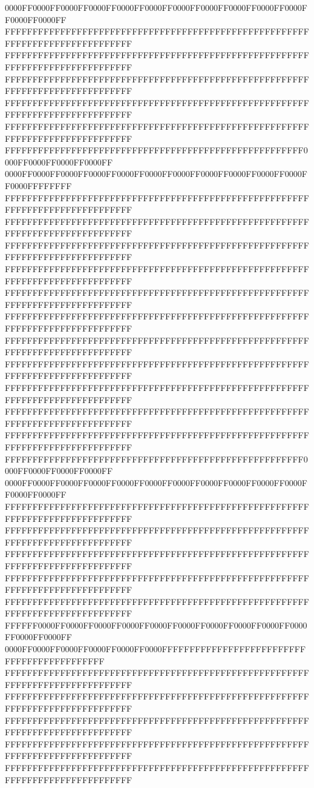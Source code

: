0000FF0000FF0000FF0000FF0000FF0000FF0000FF0000FF0000FF0000FF0000FF0000FF0000FF
FFFFFFFFFFFFFFFFFFFFFFFFFFFFFFFFFFFFFFFFFFFFFFFFFFFFFFFFFFFFFFFFFFFFFFFFFFFFFF
FFFFFFFFFFFFFFFFFFFFFFFFFFFFFFFFFFFFFFFFFFFFFFFFFFFFFFFFFFFFFFFFFFFFFFFFFFFFFF
FFFFFFFFFFFFFFFFFFFFFFFFFFFFFFFFFFFFFFFFFFFFFFFFFFFFFFFFFFFFFFFFFFFFFFFFFFFFFF
FFFFFFFFFFFFFFFFFFFFFFFFFFFFFFFFFFFFFFFFFFFFFFFFFFFFFFFFFFFFFFFFFFFFFFFFFFFFFF
FFFFFFFFFFFFFFFFFFFFFFFFFFFFFFFFFFFFFFFFFFFFFFFFFFFFFFFFFFFFFFFFFFFFFFFFFFFFFF
FFFFFFFFFFFFFFFFFFFFFFFFFFFFFFFFFFFFFFFFFFFFFFFFFFFFFF0000FF0000FF0000FF0000FF
0000FF0000FF0000FF0000FF0000FF0000FF0000FF0000FF0000FF0000FF0000FF0000FFFFFFFF
FFFFFFFFFFFFFFFFFFFFFFFFFFFFFFFFFFFFFFFFFFFFFFFFFFFFFFFFFFFFFFFFFFFFFFFFFFFFFF
FFFFFFFFFFFFFFFFFFFFFFFFFFFFFFFFFFFFFFFFFFFFFFFFFFFFFFFFFFFFFFFFFFFFFFFFFFFFFF
FFFFFFFFFFFFFFFFFFFFFFFFFFFFFFFFFFFFFFFFFFFFFFFFFFFFFFFFFFFFFFFFFFFFFFFFFFFFFF
FFFFFFFFFFFFFFFFFFFFFFFFFFFFFFFFFFFFFFFFFFFFFFFFFFFFFFFFFFFFFFFFFFFFFFFFFFFFFF
FFFFFFFFFFFFFFFFFFFFFFFFFFFFFFFFFFFFFFFFFFFFFFFFFFFFFFFFFFFFFFFFFFFFFFFFFFFFFF
FFFFFFFFFFFFFFFFFFFFFFFFFFFFFFFFFFFFFFFFFFFFFFFFFFFFFFFFFFFFFFFFFFFFFFFFFFFFFF
FFFFFFFFFFFFFFFFFFFFFFFFFFFFFFFFFFFFFFFFFFFFFFFFFFFFFFFFFFFFFFFFFFFFFFFFFFFFFF
FFFFFFFFFFFFFFFFFFFFFFFFFFFFFFFFFFFFFFFFFFFFFFFFFFFFFFFFFFFFFFFFFFFFFFFFFFFFFF
FFFFFFFFFFFFFFFFFFFFFFFFFFFFFFFFFFFFFFFFFFFFFFFFFFFFFFFFFFFFFFFFFFFFFFFFFFFFFF
FFFFFFFFFFFFFFFFFFFFFFFFFFFFFFFFFFFFFFFFFFFFFFFFFFFFFFFFFFFFFFFFFFFFFFFFFFFFFF
FFFFFFFFFFFFFFFFFFFFFFFFFFFFFFFFFFFFFFFFFFFFFFFFFFFFFFFFFFFFFFFFFFFFFFFFFFFFFF
FFFFFFFFFFFFFFFFFFFFFFFFFFFFFFFFFFFFFFFFFFFFFFFFFFFFFF0000FF0000FF0000FF0000FF
0000FF0000FF0000FF0000FF0000FF0000FF0000FF0000FF0000FF0000FF0000FF0000FF0000FF
FFFFFFFFFFFFFFFFFFFFFFFFFFFFFFFFFFFFFFFFFFFFFFFFFFFFFFFFFFFFFFFFFFFFFFFFFFFFFF
FFFFFFFFFFFFFFFFFFFFFFFFFFFFFFFFFFFFFFFFFFFFFFFFFFFFFFFFFFFFFFFFFFFFFFFFFFFFFF
FFFFFFFFFFFFFFFFFFFFFFFFFFFFFFFFFFFFFFFFFFFFFFFFFFFFFFFFFFFFFFFFFFFFFFFFFFFFFF
FFFFFFFFFFFFFFFFFFFFFFFFFFFFFFFFFFFFFFFFFFFFFFFFFFFFFFFFFFFFFFFFFFFFFFFFFFFFFF
FFFFFFFFFFFFFFFFFFFFFFFFFFFFFFFFFFFFFFFFFFFFFFFFFFFFFFFFFFFFFFFFFFFFFFFFFFFFFF
FFFFFF0000FF0000FF0000FF0000FF0000FF0000FF0000FF0000FF0000FF0000FF0000FF0000FF
0000FF0000FF0000FF0000FF0000FF0000FFFFFFFFFFFFFFFFFFFFFFFFFFFFFFFFFFFFFFFFFFFF
FFFFFFFFFFFFFFFFFFFFFFFFFFFFFFFFFFFFFFFFFFFFFFFFFFFFFFFFFFFFFFFFFFFFFFFFFFFFFF
FFFFFFFFFFFFFFFFFFFFFFFFFFFFFFFFFFFFFFFFFFFFFFFFFFFFFFFFFFFFFFFFFFFFFFFFFFFFFF
FFFFFFFFFFFFFFFFFFFFFFFFFFFFFFFFFFFFFFFFFFFFFFFFFFFFFFFFFFFFFFFFFFFFFFFFFFFFFF
FFFFFFFFFFFFFFFFFFFFFFFFFFFFFFFFFFFFFFFFFFFFFFFFFFFFFFFFFFFFFFFFFFFFFFFFFFFFFF
FFFFFFFFFFFFFFFFFFFFFFFFFFFFFFFFFFFFFFFFFFFFFFFFFFFFFFFFFFFFFFFFFFFFFFFFFFFFFF
